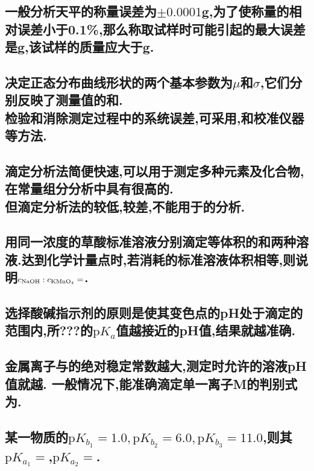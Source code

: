 \documentclass[UTF8]{article}
\newcommand{\p}{\mathrm{p}}
\newcommand{\shortline}{\underline{\hspace{1cm}}}
\newcommand{\longline}{\underline{\hspace{2cm}}}
\newcommand{\ind}{\hspace{-1pt}}
\begin{document}
    \subsection{一般分析天平的称量误差为$\pm 0.0001$g,为了使称量的相对误差小于0.1\%,那么称取试样时可能引起的最大误差是\longline g,该试样的质量应大于\longline g.}
    
    \subsection{决定正态分布曲线形状的两个基本参数为$\mu$和$\sigma$,它们分别反映了测量值的\longline \ind 和\longline.\\ 检验和消除测定过程中的系统误差,可采用\longline ,\longline\ind 和校准仪器等方法.}
    
    \subsection{滴定分析法简便快速,可以用于测定多种元素及化合物,在常量组分分析中具有很高的\longline.\\ 但滴定分析法的\longline \ind 较低,\longline \ind 较差,不能用于\longline \ind 的分析.}
    
    \subsection{用同一浓度的草酸标准溶液分别滴定等体积的和两种溶液.达到化学计量点时,若消耗的标准溶液体积相等,则说明$c_{\ce{NaOH}}:c_{\ce{KMnO4}}=$\shortline.}
    
    \subsection{选择酸碱指示剂的原则是使其变色点的pH处于滴定的\longline \ind 范围内,所???的$\p K_a$值越接近\longline \ind 的pH值,结果就越准确.}
    
    \subsection{金属离子与的绝对稳定常数越大,测定时允许的溶液pH值就越\shortline. 一般情况下,能准确滴定单一离子M的判别式为\underline{\hspace{3cm}}.}
        
    \subsection{某一物质的$\p K_{b_1}=1.0,\p K_{b_2}=6.0,\p K_{b_3}=11.0$,则其$\p K_{a_1}=$\longline ,$\p K_{a_2}=$\longline.}
        
\end{document}
